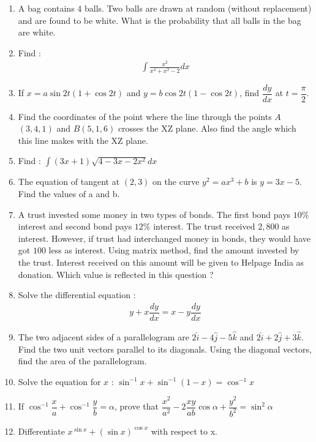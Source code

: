 \documentclass[12pt,-letter paper]{article}
\providecommand{\brak}[1]{\ensuremath{\left(#1\right)}}
\theoremstyle{remark}
\begin{document}
\begin{enumerate}
    \item A bag contains $4$ balls. Two balls are drawn at random (without replacement) and are found to be white. What is the probability that all balls in the bag are white.
    \item Find :
    \begin{align*}
        \int{\frac{x^2}{x^4+x^2-2}}dx
    \end{align*}
    \item If $x = a \sin 2t (1+\cos 2t)$ and $y = b \cos 2t(1-\cos 2t)$, find $\dfrac{dy}{dx}$ at $t = \dfrac{\pi}{2}$.
    \item Find the coordinates of the point where the line through the points $A$\brak{3, 4, 1} and $B$\brak{5, 1, 6 } crosses the $\mathrm{XZ}$ plane. Also find the angle which this line makes with the $\mathrm{XZ}$ plane.
    \item Find : $\int{\brak{3x + 1} \sqrt{4-3x-2x^2}}dx $
    \item The equation of tangent at \brak{2,3} on the curve $y^2=ax^3+b$ is $y=3x-5$. Find the values of a and b.
    \item A trust invested some money in two types of bonds. The first bond pays $10\%$ interest and second bond pays $12\%$ interest. The trust received \rupee $2,800$ as interest. However, if trust had interchanged money in bonds, they would have got \rupee $100$ less as interest. Using matrix method, find the amount invested by the trust. Interest received on this amount will be given to Helpage India as donation. Which value is reflected in this question ?
    \item Solve the differential equation : 
    \begin{align*}
        y+ x\dfrac{dy}{dx} = x- y\dfrac{dy}{dx}
    \end{align*} 
    \item The two adjacent sides of a parallelogram are $2\hat{i} - 4\hat{j}-5\hat{k}$ and $2\hat{i}+2\hat{j}+3\hat{k}$. Find the two unit vectors parallel to its diagonals. Using the diagonal vectors, find the area of the parallelogram.
    \item Solve the equation for $x$ : $\sin^{-1} x+\sin^{-1}(1-x)=\cos^{-1}x$
    
    \item If $\cos^{-1}\dfrac{x}{a}+\cos^{-1}\dfrac{y}{b}=\alpha$, prove that $\dfrac{x^2}{a^2} - 2\dfrac{xy}{ab}\cos\alpha + \dfrac{y^2}{b^2} = \sin^2\alpha$
    \item Differentiate $x^{\sin x} + \brak{\sin x}^{\cos x}$ with respect to x.
    

\end{enumerate}
\end{document}

